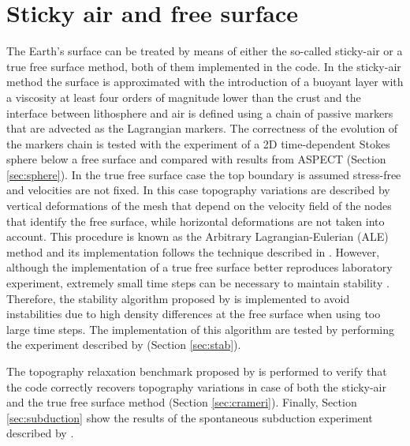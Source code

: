 \documentclass[hidelinks,11pt,a4paper]{article}
\begin{document}
\section{Sticky air and free surface}\label{sec:sticky}
The Earth's surface can be treated by means of either the so-called sticky-air or a true free surface method, both of them implemented in the code. In the sticky-air method the surface is approximated with the introduction of a buoyant layer with a viscosity at least four orders of magnitude lower than the crust \citep{Schmeling2008,Crameri2012} and the interface between lithosphere and air is defined using a chain of passive markers that are advected as the Lagrangian markers. The correctness of the evolution of the markers chain is tested with the experiment of a 2D time-dependent Stokes sphere below a free surface and compared with results from ASPECT \citep{KHB12,heister_aspect_methods2,aspect-doi-v2.2.0,aspectmanual} (Section \ref{sec:sphere}). In the true free surface case the top boundary is assumed stress-free and velocities are not fixed. In this case topography variations are described by vertical deformations of the mesh that depend on the velocity field of the nodes that identify the free surface, while horizontal deformations are not taken into account. This procedure is known as the Arbitrary Lagrangian-Eulerian (ALE) method and its implementation follows the technique described in \citet{Thieulot2011}. However, although the implementation of a true free surface better reproduces laboratory experiment, extremely small time steps can be necessary to maintain stability \citep{Kaus2010a,Quinquis2011,Thieulot2014}. Therefore, the stability algorithm proposed by \citet{Kaus2010a} is implemented to avoid instabilities due to high density differences at the free surface when using too large time steps. The implementation of this algorithm are tested by performing the experiment described by \citet{Kaus2010a} (Section \ref{sec:stab}).

The topography relaxation benchmark proposed by \citet{Crameri2012} is performed to verify that the code correctly recovers topography variations in case of both the sticky-air and the true free surface method (Section \ref{sec:crameri}). Finally, Section \ref{sec:subduction} show the results of the spontaneous subduction experiment described by \citet{Schmeling2008}.
\end{document}
